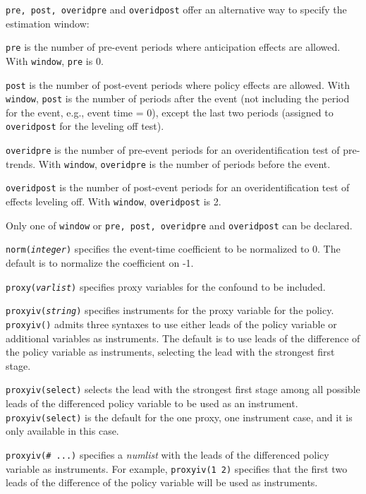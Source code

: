 \documentclass[12pt]{article}
\begin{document}
\hangpara
{\tt pre, post, overidpre} and {\tt overidpost} offer an alternative way to specify the estimation window:

\morehangpara
{\tt pre} is the number of pre-event periods where anticipation effects are allowed.
With {\tt window}, {\tt pre} is 0.

\morehangpara
{\tt post} is the number of post-event periods where policy effects are allowed.
With {\tt window}, {\tt post} is the number of periods after the event (not including the period for the event, e.g., event time = 0), except the last two periods (assigned to {\tt overidpost} for the leveling off test).

\morehangpara
{\tt overidpre} is the number of pre-event periods for an overidentification test of pre-trends. With {\tt window}, {\tt overidpre} is the number of periods before the event.

\morehangpara
{\tt overidpost} is the number of post-event periods for an overidentification test of effects leveling off. With {\tt window}, {\tt overidpost} is 2.

\hangpara
Only one of {\tt window} or {\tt pre, post, overidpre} and {\tt overidpost} can be declared.

\hangpara
{\tt norm({\it integer})} specifies the event-time coefficient to be normalized to 0. The default is to normalize the coefficient on -1.

\hangpara
{\tt proxy({\it varlist})} specifies proxy variables for the confound to be included.

\hangpara
{\tt proxyiv({\it string})} specifies instruments for the proxy variable for the policy.
{\tt proxyiv()} admits three syntaxes to use either leads of the policy variable or additional variables as instruments.
The default is to use leads of the difference of the policy variable as instruments, selecting the lead with the strongest first stage.

\morehangpara
{\tt proxyiv(select)} selects the lead with the strongest first stage among all possible leads of the differenced policy variable to be used as an instrument.
{\tt proxyiv(select)} is the default for the one proxy, one instrument case, and it is only available in this case.

\morehangpara
{\tt proxyiv(\# ...)} specifies a \textit{numlist} with the leads of the differenced policy variable as instruments. For example, {\tt proxyiv(1 2)} specifies that the first two leads of the difference of the policy variable will be used as instruments.
\end{document}
